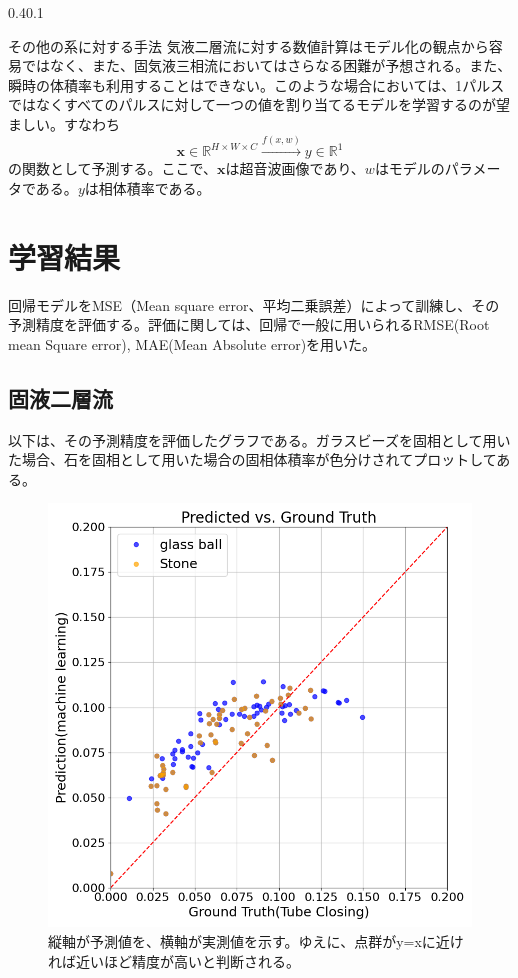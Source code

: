 \documentclass[uplatex]{suribt}
\makeatletter
\renewcommand{\subsection}{%
    \@startsection{subsection}{1}{\z@}%
    {0.4\Cvs}{0.1\Cvs}%
    {\normalfont\normalsize\headfont\raggedright}}
\makeatother
\begin{document}
\subsection{その他の系に対する手法}
気液二層流に対する数値計算はモデル化の観点から容易ではなく、また、固気液三相流においてはさらなる困難が予想される。また、瞬時の体積率も利用することはできない。このような場合においては、1パルスではなくすべてのパルスに対して一つの値を割り当てるモデルを学習するのが望ましい。すなわち
\begin{equation}
    \mathbf{x} \in \mathbb{R}^{H \times W\times C} \stackrel{f(x,w)}{\to} y \in \mathbb{R}^1
\end{equation}
の関数として予測する。ここで、$\mathbf{x}$は超音波画像であり、$w$はモデルのパラメータである。$y$は相体積率である。
\chapter{学習結果}
回帰モデルをMSE（Mean square error、平均二乗誤差）によって訓練し、その予測精度を評価する。評価に関しては、回帰で一般に用いられるRMSE(Root mean Square error), MAE(Mean Absolute error)を用いた。
\section{固液二層流}
以下は、その予測精度を評価したグラフである。ガラスビーズを固相として用いた場合、石を固相として用いた場合の固相体積率が色分けされてプロットしてある。
\begin{figure}[htbp]
    \centering
    \includegraphics[width=0.4\linewidth]{pictures/results/predicted_vs_ground_truth_noerrorbars.png}
    \caption{縦軸が予測値を、横軸が実測値を示す。ゆえに、点群がy=xに近ければ近いほど精度が高いと判断される。}
    \label{fig:prediction_vs_ground_truth}
\end{figure}

\newpage
\end{document}
